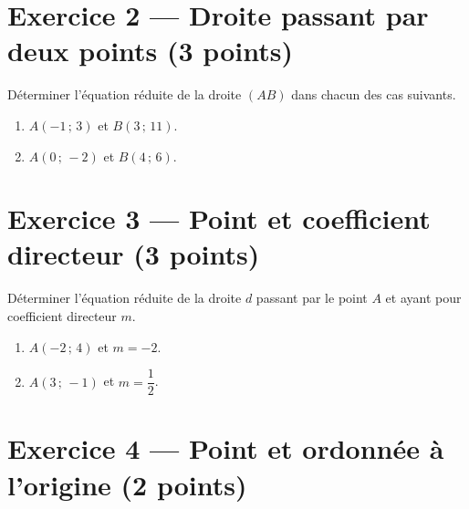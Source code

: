\documentclass[11pt,a4paper]{article}
\begin{document}
\vspace{4pt}

\section*{Exercice 2 — Droite passant par deux points \hfill \normalsize (3 points)}

\noindent\small Déterminer l'équation réduite de la droite $(AB)$ dans chacun des cas
suivants.

\begin{enumerate}[label=\textbf{\arabic*.}, leftmargin=18pt]
  \item $A(-1\,;\,3)$ et $B(3\,;\,11)$.
  \item $A(0\,;\,-2)$ et $B(4\,;\,6)$.
\end{enumerate}

\vspace{4pt}

\section*{Exercice 3 — Point et coefficient directeur \hfill \normalsize (3 points)}

\noindent\small Déterminer l'équation réduite de la droite $d$ passant par le point $A$
et ayant pour coefficient directeur $m$.

\begin{enumerate}[label=\textbf{\arabic*.}, leftmargin=18pt]
  \item $A(-2\,;\,4)$ et $m = -2$.
  \item $A(3\,;\,-1)$ et $m = \dfrac{1}{2}$.
\end{enumerate}

\vspace{4pt}

\section*{Exercice 4 — Point et ordonnée à l'origine \hfill \normalsize (2 points)}
\end{document}
